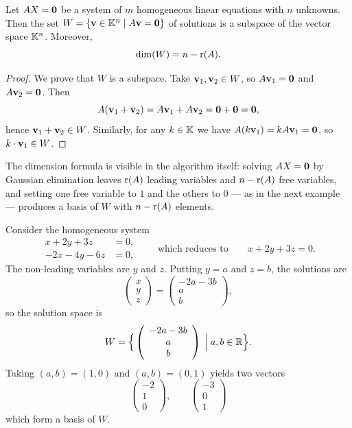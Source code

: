\begin{theorem}
Let $AX=\mathbf{0}$ be a system of $m$ homogeneous linear equations with $n$ unknowns. Then the set
$W=\{\mathbf{v}\in \mathbb{K}^n\mid A\mathbf{v}=\mathbf{0}\}$ of solutions is a subspace of the vector space $\mathbb{K}^n$. Moreover,
\[
\dim(W) = n-\operatorname{r}(A).
\]
\end{theorem}

\begin{proof}
We prove that $W$ is a subspace. Take $\mathbf{v}_1,\mathbf{v}_2\in W$, so $A\mathbf{v}_1=\mathbf{0}$ and $A\mathbf{v}_2=\mathbf{0}$. Then
\[
A(\mathbf{v}_1+\mathbf{v}_2) = A\mathbf{v}_1+A\mathbf{v}_2 = \mathbf{0}+\mathbf{0}=\mathbf{0},
\]
hence $\mathbf{v}_1+\mathbf{v}_2\in W$. Similarly, for any $k\in \mathbb{K}$ we have $A(k\mathbf{v}_1)=kA\mathbf{v}_1=\mathbf{0}$, so $k\cdot \mathbf{v}_1\in W$.
\end{proof}

\begin{remark}
The dimension formula is visible in the algorithm itself: solving $AX=\mathbf{0}$ by Gaussian elimination leaves
$\operatorname{r}(A)$ leading variables and $n-\operatorname{r}(A)$ free variables, and setting one free variable to $1$ and the
others to $0$ — as in the next example — produces a basis of $W$ with $n-\operatorname{r}(A)$ elements.
\end{remark}

\begin{example}
Consider the homogeneous system
\[
\begin{aligned}
x+2y+3z &= 0,\\ -2x-4y-6z &= 0,
\end{aligned}
\qquad\text{which reduces to}\qquad
x+2y+3z = 0.
\]
The non-leading variables are $y$ and $z$. Putting $y=a$ and $z=b$, the solutions are
\[
\left( \begin{array}{c} x \\ y \\ z \end{array} \right )= \left( \begin{array}{c} -2a-3b \\ a \\ b \end{array} \right ),
\]
so the solution space is
\[
W = \Big\{ \left( \begin{array}{c} -2a-3b \\ a \\ b \end{array} \right ) \;\Big|\; a,b\in\mathbb{R}\Big\}.
\]
Taking $(a,b)=(1,0)$ and $(a,b)=(0,1)$ yields two vectors
\[
\left( \begin{array}{c} -2 \\ 1 \\ 0 \end{array} \right ),\qquad
\left( \begin{array}{c} -3 \\ 0 \\ 1 \end{array} \right )
\]
which form a basis of $W$.
\end{example}

